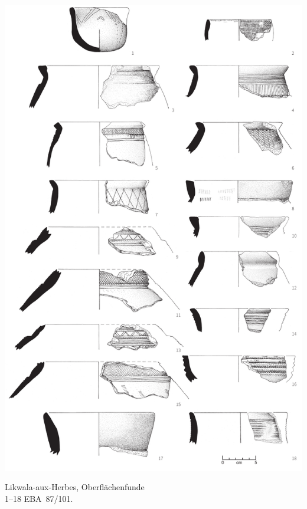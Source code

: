 \begin{pl}[H]
	\includegraphics{plt/Taf81.pdf}
	\vspace{.75em}\caption{Likwala-aux-Herbes, Oberflächenfunde \\ 1--18 EBA~87/101.}
	\label{pl:81}
\end{pl}

